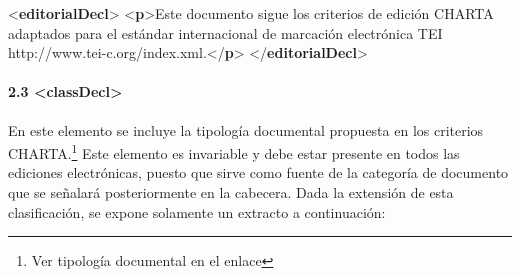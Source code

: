 \documentclass[
]{book}
\newenvironment{Shaded}{\begin{snugshade}}{\end{snugshade}}
\newcommand{\KeywordTok}[1]{\textcolor[rgb]{0.13,0.29,0.53}{\textbf{#1}}}
\newcommand{\NormalTok}[1]{#1}
\begin{document}
\begin{Shaded}
\begin{Highlighting}[]
\NormalTok{\textless{}}\KeywordTok{editorialDecl}\NormalTok{\textgreater{} }
\NormalTok{  \textless{}}\KeywordTok{p}\NormalTok{\textgreater{}Este documento sigue los criterios de edición CHARTA adaptados para el estándar internacional de marcación electrónica TEI http://www.tei{-}c.org/index.xml.\textless{}/}\KeywordTok{p}\NormalTok{\textgreater{}}
\NormalTok{\textless{}/}\KeywordTok{editorialDecl}\NormalTok{\textgreater{}}
\end{Highlighting}
\end{Shaded}

\hypertarget{classdecl}{%
\paragraph*{\texorpdfstring{2.3 { \textless classDecl\textgreater{} }}{2.3  \textless classDecl\textgreater{} }}\label{classdecl}}

En este elemento se incluye la tipología documental propuesta en los criterios CHARTA.\footnote{Ver tipología documental en el enlace} Este elemento es invariable y debe estar presente en todos las ediciones electrónicas, puesto que sirve como fuente de la categoría de documento que se señalará posteriormente en la cabecera. Dada la extensión de esta clasificación, se expone solamente un extracto a continuación:
\end{document}
